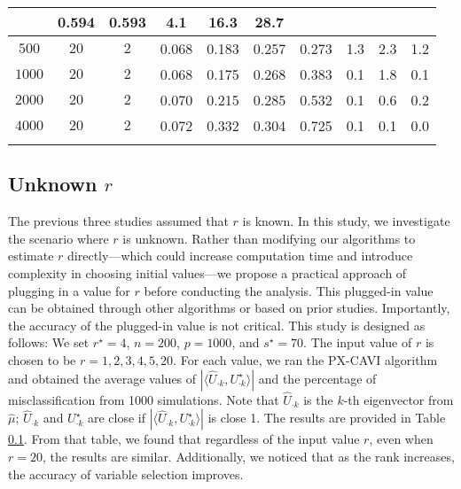 \documentclass[pdftex, noinfoline, letter]{imsart}
\theoremstyle{plain}
\begin{document}
\begin{table}[h!]
\begin{adjustwidth}{-.3in}{-.3in}
{\begin{tabular}{ccc|cccc||ccc}
    & 0.594 & 0.593 
    & 4.1 & 16.3 & 28.7\\   
\hline 
    $500$ & $20$ & $2$  &
    0.068 & 0.183 
    & 0.257  & 0.273 
    & 1.3 & 2.3 & 1.2
    \\
    $1000$ & $20$ & $2$ &
    0.068 & 0.175 
    & 0.268 &0.383 
    & 0.1 & 1.8 & 0.1\\
    $2000$ & $20$ & $2$ &
    0.070 & 0.215 
    & 0.285  & 0.532
    & 0.1 & 0.6 & 0.2 \\
    $4000$ & $20$ & $2$  &
    0.072 & 0.332 
    & 0.304  & 0.725
    & 0.1 & 0.1& 0.0 \\
\Xhline{2\arrayrulewidth}    
\end{tabular}  
}
\end{adjustwidth}
\end{table}


\subsection{Unknown $r$}
\label{sim-4}

The previous three studies assumed that $r$ is known. In this study, we investigate the scenario where $r$ is unknown. Rather than modifying our algorithms to estimate $r$ directly—which could increase computation time and introduce complexity in choosing initial values—we propose a practical approach of plugging in a value for $r$ before conducting the analysis. This plugged-in value can be obtained through other algorithms or based on prior studies. Importantly, the accuracy of the plugged-in value is not critical.
This study is designed as follows: We set $r^\star = 4$, $n = 200$, $p = 1000$, and $s^\star = 70$. The input value of $r$ is chosen to be $r = 1, 2, 3, 4, 5, 20$.
For each value, we ran the PX-CAVI algorithm and obtained the average values of $|\langle \widehat  U_{\cdot k}, U_{\cdot k}^\star \rangle|$ and the percentage of misclassification from 1000 simulations.
Note that $\widehat  U_{\cdot k}$ is the $k$-th eigenvector from $\widehat  \mu$; 
$\widehat  U_{\cdot k}$ and $U_{\cdot k}^\star$ are close if $|\langle \widehat  U_{\cdot k}, U_{\cdot k}^\star \rangle|$ is close 1.
The results are provided in Table \ref{sim-4}. From that table, we found that regardless of the input value $r$, even when $r = 20$, the results are similar. Additionally, we noticed that as the rank increases, the accuracy of variable selection improves. 
\end{document}
